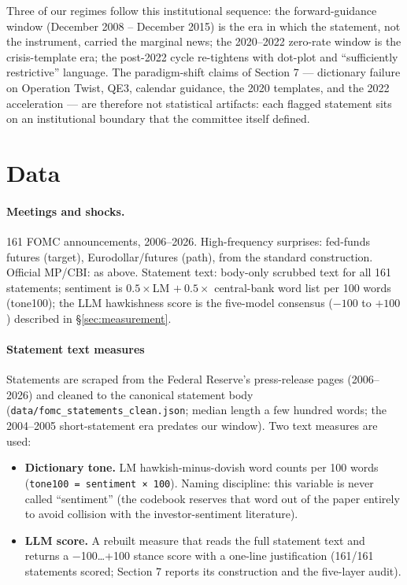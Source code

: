 \documentclass[11pt]{article}
\providecommand{\tightlist}{\setlength{\itemsep}{0pt}\setlength{\parskip}{0pt}}
\begin{document}
Three of our regimes follow this institutional sequence: the forward-guidance window (December 2008 -- December 2015) is the era in which the statement, not the instrument, carried the marginal news; the 2020--2022 zero-rate window is the crisis-template era; the post-2022 cycle re-tightens with dot-plot and ``sufficiently restrictive'' language. The paradigm-shift claims of Section 7 --- dictionary failure on Operation Twist, QE3, calendar guidance, the 2020 templates, and the 2022 acceleration --- are therefore not statistical artifacts: each flagged statement sits on an institutional boundary that the committee itself defined.



\section{Data}\label{sec:data}

\paragraph{Meetings and shocks.} 161 FOMC announcements, 2006--2026.
High-frequency surprises: fed-funds futures (target), Eurodollar/futures
(path), from the standard construction. Official MP/CBI: as above. Statement
text: body-only scrubbed text for all 161 statements; sentiment is
$0.5\times$LM $+\ 0.5\times$ central-bank word list per 100 words
(tone100); the LLM hawkishness score is the five-model consensus
($-100$ to $+100$) described in \S\ref{sec:measurement}.

\paragraph{Statement text measures}\label{statement-text-measures}

Statements are scraped from the Federal Reserve's press-release pages (2006--2026) and cleaned to the canonical statement body (\texttt{data/fomc\_statements\_clean.json}; median length a few hundred words; the 2004--2005 short-statement era predates our window). Two text measures are used:

\begin{itemize}
\tightlist
\item
  \textbf{Dictionary tone.} LM hawkish-minus-dovish word counts per 100 words (\texttt{tone100\ =\ sentiment\ ×\ 100}). Naming discipline: this variable is never called ``sentiment'' (the codebook reserves that word out of the paper entirely to avoid collision with the investor-sentiment literature).
\item
  \textbf{LLM score.} A rebuilt measure that reads the full statement text and returns a −100\ldots+100 stance score with a one-line justification (161/161 statements scored; Section 7 reports its construction and the five-layer audit).
\end{itemize}
\end{document}
